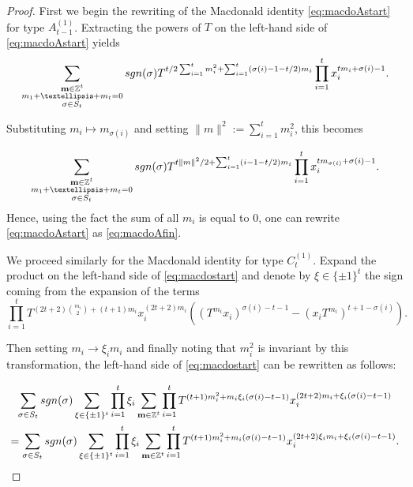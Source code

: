 \documentclass[11pt,letterpaper]{amsart}
\def\bbbz{\mathbb Z}
\def\det{{\rm det}}
\def\sgn{{\rm sgn}}
\numberwithin{equation}{section}
\numberwithin{df}{section}
\begin{document}
\begin{proof}

\noindent First we begin the rewriting of the Macdonald identity \eqref{eq:macdoAstart} for type $A^{(1)}_{t-1}$. Extracting  the powers of $T$ on the left-hand side of \eqref{eq:macdoAstart} yields
$$
\sum_{\substack{\mathbf{m}\in\bbbz^t\\m_1+\dots+m_t=0\\\sigma\in S_t}}\sgn(\sigma)T^{t/2 \sum_{i=1}^tm_i^2+\sum_{i=1}^t(\sigma(i)-1-t/2)m_i}\prod_{i=1}^tx_i^{tm_i+\sigma(i)-1}.$$

Substituting $m_i\mapsto m_{\sigma(i)}$ and setting $\lVert m\rVert^2:=\sum_{i=1}^tm_i^2$, this becomes

$$
\sum_{\substack{\mathbf{m}\in\bbbz^t\\m_1+\dots+m_t=0\\\sigma\in S_t}}\sgn(\sigma)T^{t\lVert m\rVert^2/2+\sum_{i=1}^t(i-1-t/2)m_i}\prod_{i=1}^tx_i^{tm_{\sigma(i)}+\sigma(i)-1}.$$
\noindent Hence, using the fact the sum of all $m_i$ is equal to $0$, one can rewrite \eqref{eq:macdoAstart} as \eqref{eq:macdoAfin}.

We proceed similarly for the Macdonald identity for type $C^{(1)}_{t}$. Expand the product on the left-hand side of \eqref{eq:macdostart} and denote by $\xi\in\lbrace \pm 1\rbrace^t$ the sign coming from the expansion of the terms $$\prod_{i=1}^t T^{(2t+2)\binom{m_i}{2}+(t+1)m_i}x_i^{(2t+2)m_i}\left((T^{m_i}x_i)^{\sigma(i)-t-1}-(x_iT^{m_i})^{t+1-\sigma(i)}\right).$$

\noindent Then setting $m_i\to \xi_i m_i$ and finally noting that $m_i^2$ is invariant by this transformation, the left-hand side of \eqref{eq:macdostart} can be rewritten as follows:

\begin{multline*}
\sum_{\sigma\in S_t}\sgn(\sigma) \sum_{\xi\in\lbrace \pm 1\rbrace^t}\prod_{i=1}^t \xi_i \sum_{\mathbf{m}\in\bbbz^t}\prod_{i=1}^t T^{(t+1)m_i^2+m_i \xi_i(\sigma(i)-t-1)} x_i^{(2t+2)m_i+\xi_i(\sigma(i)-t-1)}\\
=\sum_{\sigma\in S_t}\sgn(\sigma) \sum_{\xi\in\lbrace \pm 1\rbrace^t}\prod_{i=1}^t \xi_i\sum_{\mathbf{m}\in\bbbz^t}\prod_{i=1}^t  T^{(t+1)m_i^2+m_i(\sigma(i)-t-1)} x_i^{(2t+2)\xi_im_i+\xi_i(\sigma(i)-t-1)}.
\end{multline*}


\end{proof}
\end{document}
